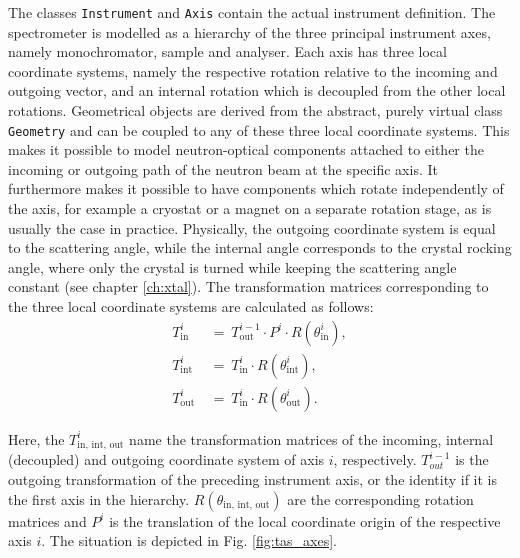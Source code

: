 The classes \lstinline[language=C++]|Instrument| and \lstinline[language=C++]|Axis| contain the actual instrument definition.
The spectrometer is modelled as a hierarchy of the three principal instrument axes, namely monochromator, sample and analyser.
Each axis has three local coordinate systems, namely the respective rotation relative to the incoming and outgoing vector,
and an internal rotation which is decoupled from the other local rotations.
Geometrical objects are derived from the abstract, purely virtual class \lstinline[language=C++]|Geometry| and can be
coupled to any of these three local coordinate systems.
This makes it possible to model neutron-optical components attached to either the incoming or outgoing path of the
neutron beam at the specific axis. 
It furthermore makes it possible to have components which rotate independently of the axis, for example a cryostat or
a magnet on a separate rotation stage, as is usually the case in practice.
Physically, the outgoing coordinate system is equal to the scattering angle, while the internal angle corresponds
to the crystal rocking angle, where only the crystal is turned while keeping the scattering angle constant \cite{TODO} (see chapter \ref{ch:xtal}).
The transformation matrices corresponding to the three local coordinate systems are calculated as follows:
\begin{equation}
\begin{split}
	T_{\mathrm{in}}^{i} & \ =\  T_{\mathrm{out}}^{i-1} \cdot P^{i} \cdot R\left(\theta_{\mathrm{in}}^{i}\right), \\
	T_{\mathrm{int}}^{i} & \ =\  T_{\mathrm{in}}^{i} \cdot R\left(\theta_{\mathrm{int}}^{i}\right), \\
	T_{\mathrm{out}}^{i} & \ =\  T_{\mathrm{in}}^{i} \cdot R\left(\theta_{\mathrm{out}}^{i}\right).
\end{split}
\end{equation}

Here, the $T_{\mathrm{in,\, int,\, out}}^{i}$ name the transformation matrices of the incoming, internal (decoupled) 
and outgoing coordinate system of axis $i$, respectively.
$T_{out}^{i-1}$ is the outgoing transformation of the preceding instrument axis, or the identity if it is the first axis 
in the hierarchy.
$R\left(\theta_{\mathrm{in,\, int,\, out}}\right)$ are the corresponding rotation matrices and $P^i$ is the translation
of the local coordinate origin of the respective axis $i$.
The situation is depicted in Fig. \ref{fig:tas_axes}.


